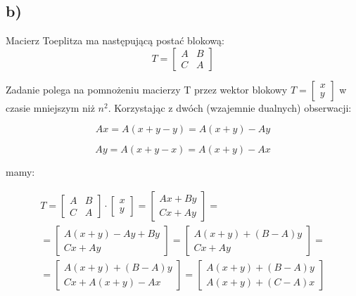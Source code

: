 \documentclass[svgnames]{report}
\begin{document}
\subsection{b)}
Macierz Toeplitza ma następującą postać blokową:
$$ T = \left[ \begin{matrix}
					A & B \\
					C & A
				\end{matrix} \right]$$

Zadanie polega na pomnożeniu macierzy T przez wektor blokowy $ T = \left[ \begin{matrix}x \\ y\end{matrix} \right] $ w czasie mniejszym niż $n^2$. Korzystając z dwóch (wzajemnie dualnych) obserwacji:

$$Ax = A(x + y - y) = A(x+y) - Ay$$

$$Ay = A(x + y - x) = A(x+y) - Ax$$


mamy:


\begin{equation*}
\begin{split}
T = \left[ \begin{matrix}A & B\\ C & A\end{matrix} \right] \cdot \left[ \begin{matrix} x \\ y\end{matrix} \right] = \left[ \begin{matrix} Ax + By\\ Cx + Ay\end{matrix} \right] = \\
= \left[ \begin{matrix}A(x+y)-Ay + By\\ Cx + Ay\end{matrix} \right] = \left[ \begin{matrix}A(x+y)+(B - A)y\\ Cx + Ay\end{matrix} \right] = \\
= \left[ \begin{matrix}A(x+y)+(B - A)y\\ Cx + A(x+y) - Ax \end{matrix} \right] =  \left[ \begin{matrix}A(x+y)+(B - A)y\\ A(x+y) + (C-A)x\end{matrix} \right]
\end{split}
\end{equation*}
\end{document}
